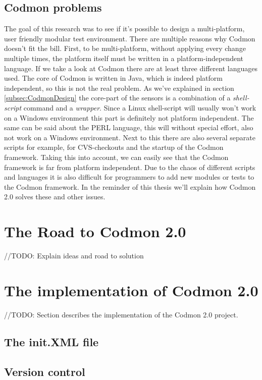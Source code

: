 \documentclass[a4paper,10pt]{scrartcl}
\newcommand{\project}{Codmon 2.0}
\begin{document}
\subsection{Codmon problems}
\label{subsec:CodmonProblems}
The goal of this research was to see if it's possible to design a multi-platform, user friendly modular test environment. There are multiple reasons why Codmon doesn't fit the bill. First,
to be multi-platform, without applying every change multiple times, the platform itself must be written in a platform-independent language. If we take a look at Codmon there are at least three 
different languages used. The core of Codmon is written in Java, which is indeed platform independent\cite{Java}, so this is not the real problem. As we've explained in section \ref{subsec:CodmonDesign} the
core-part of the sensors is a combination of a \emph{shell-script} command and a \emph{wrapper}. Since a Linux shell-script will usually won't work on a Windows environment this part is definitely
not platform independent. The same can be said about the PERL language, this will without special effort, also not work on a Windows environment. Next to this there are also several separate
scripts for example, for  CVS-checkouts and the startup of the Codmon framework. Taking this into account, we can easily see that the Codmon framework is far from platform independent. Due to the chaos of 
different scripts and languages it is also difficult for programmers to add new modules or tests to the Codmon framework. In the reminder of this thesis we'll explain how \project{} solves
these and other issues. 

\newpage
\section{The Road to \project{}}
\label{sec:road}

//TODO: Explain ideas and road to solution

\newpage
\section{The implementation of \project{}}
\label{sec:Codmon2.0}
//TODO: Section describes the implementation of the \project{} project.
\subsection{The init.XML file}
\label{subsec:init}

\subsection{Version control}
\label{subsec:versionControl}
\end{document}
